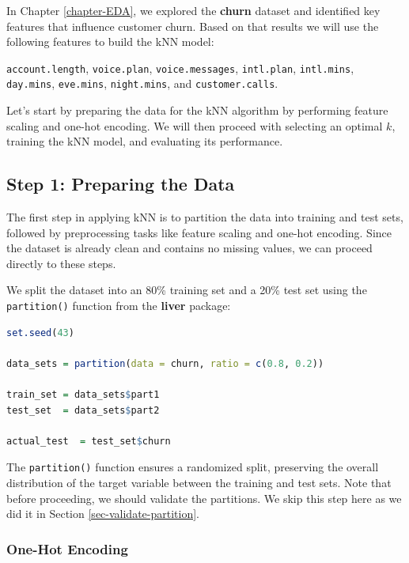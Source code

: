 \documentclass[
]{book}
\newcommand{\passthrough}[1]{#1}
\theoremstyle{definition}
\theoremstyle{definition}
\theoremstyle{definition}
\theoremstyle{definition}
\theoremstyle{remark}
\begin{document}
In Chapter \ref{chapter-EDA}, we explored the \textbf{churn} dataset and identified key features that influence customer churn. Based on that results we will use the following features to build the kNN model:

\passthrough{\lstinline!account.length!}, \passthrough{\lstinline!voice.plan!}, \passthrough{\lstinline!voice.messages!}, \passthrough{\lstinline!intl.plan!}, \passthrough{\lstinline!intl.mins!}, \passthrough{\lstinline!day.mins!}, \passthrough{\lstinline!eve.mins!}, \passthrough{\lstinline!night.mins!}, and \passthrough{\lstinline!customer.calls!}.

Let's start by preparing the data for the kNN algorithm by performing feature scaling and one-hot encoding. We will then proceed with selecting an optimal \(k\), training the kNN model, and evaluating its performance.

\subsection{Step 1: Preparing the Data}\label{step-1-preparing-the-data}

The first step in applying kNN is to partition the data into training and test sets, followed by preprocessing tasks like feature scaling and one-hot encoding. Since the dataset is already clean and contains no missing values, we can proceed directly to these steps.

We split the dataset into an 80\% training set and a 20\% test set using the \passthrough{\lstinline!partition()!} function from the \textbf{liver} package:

\begin{lstlisting}[language=R]
set.seed(43)

data_sets = partition(data = churn, ratio = c(0.8, 0.2))

train_set = data_sets$part1
test_set  = data_sets$part2

actual_test  = test_set$churn
\end{lstlisting}

The \passthrough{\lstinline!partition()!} function ensures a randomized split, preserving the overall distribution of the target variable between the training and test sets. Note that before proceeding, we should validate the partitions. We skip this step here as we did it in Section \ref{sec-validate-partition}.

\subsubsection*{One-Hot Encoding}\label{one-hot-encoding-2}
\end{document}

